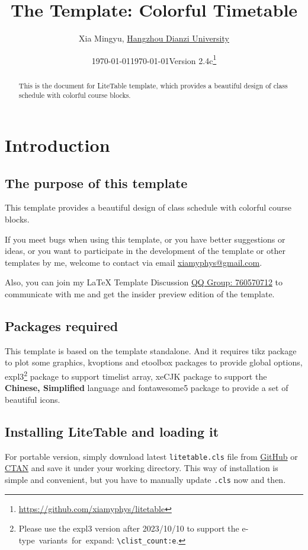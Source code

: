 \documentclass[11pt]{article}
\title{\bfseries The \pkg{LiteTable} Template: Colorful Timetable}
\author{Xia Mingyu, \href{https://www.hdu.edu.cn}{Hangzhou Dianzi University}}
\date{\today}
\affil{\href{mailto:xiamyphys@gmail.com}{\ttfamily xiamyphys@gmail.com}}
\date{\today\quad Version 2.4c\thanks{%
  \url{https://github.com/xiamyphys/litetable}}}
\def\pkg#1{\texorpdfstring{\textcolor{pkgcolor}{\textsf{#1}}}{“#1”}}
\def\cmd#1{\texorpdfstring{\textcolor{cmdcolor}{\textsf{#1}}}{“#1”}}
\begin{document}
\maketitle

\vspace{-2em}
\begin{abstract}
This is the document for \pkg{LiteTable} template, which provides a beautiful design of class schedule with colorful course blocks.
\end{abstract}

\tableofcontents

\clearpage

\section{Introduction}

\subsection{The purpose of this template}
This template provides a beautiful design of class schedule with colorful course blocks.

If you meet bugs when using this template, or you have better suggestions or ideas, or you want to participate in the development of the template or other templates by me, welcome to contact via email \href{mailto:xiamyphys@gmail.com}{\ttfamily xiamyphys@gmail.com}.

Also, you can join my \textsf\LaTeX{} Template Discussion \href{https://qm.qq.com/q/OnHzbNvVAG}{QQ Group: 760570712} to communicate with me and get the insider preview edition of the template.

\subsection{Packages required}
This template is based on the template \pkg{standalone}. And it requires \pkg{tikz} package to plot some graphics, \pkg{kvoptions} and \pkg{etoolbox} packages to provide global options, \pkg{expl3}\footnote{Please use the \pkg{expl3} version after 2023/10/10 to support the e-type variants for expand: \verb|\clist_count:e|.} package to support \cmd{timelist} array, \pkg{xeCJK} package to support the \textbf{Chinese, Simplified} language and \pkg{fontawesome5} package to provide a set of beautiful icons.

\subsection{Installing \pkg{LiteTable} and loading it}
For portable version, simply download latest \verb|litetable.cls| file from \href{https://github.com/xiamyphys/LiteTable}{GitHub} or \href{https://ctan.org/pkg/litetable}{CTAN} and save it under your working directory. This way of installation is simple and convenient, but you have to manually update \verb|.cls| now and then.
\end{document}
